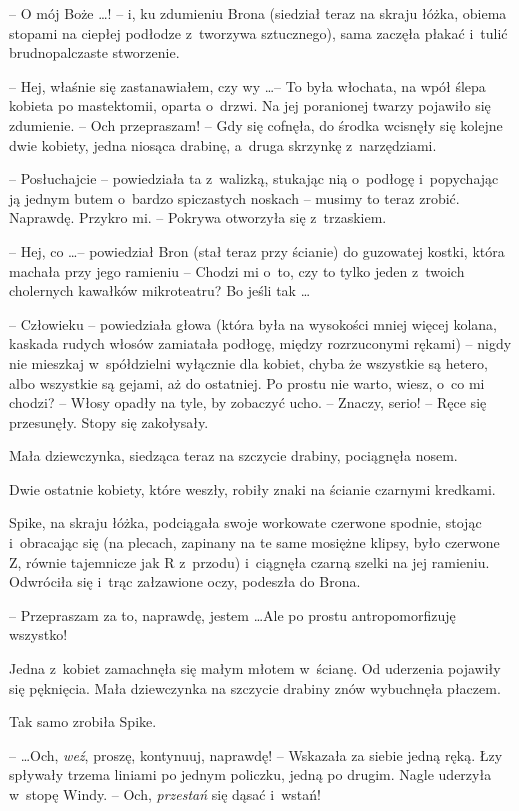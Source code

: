 \documentclass[oneside,polish,11pt,rmheadings]{mwbk}
\begin{document}
 -- O mój Boże \ldots ! -- i, ku zdumieniu Brona (siedział teraz na skraju łóżka, obiema stopami na ciepłej podłodze z~tworzywa sztucznego), sama zaczęła płakać i~tulić brudnopalczaste stworzenie.  

-- Hej, właśnie się zastanawiałem, czy wy \ldots  -- To była włochata, na wpół ślepa kobieta po mastektomii, oparta o~drzwi.  Na jej poranionej twarzy pojawiło się zdumienie. -- Och przepraszam! -- Gdy się cofnęła, do środka wcisnęły się kolejne dwie kobiety, jedna niosąca drabinę, a~druga skrzynkę z~narzędziami. 

-- Posłuchajcie -- powiedziała ta z~walizką, stukając nią o~podłogę i~popychając ją jednym butem o~bardzo spiczastych noskach -- musimy to teraz zrobić. Naprawdę. Przykro mi. -- Pokrywa otworzyła się z~trzaskiem. 

-- Hej, co \ldots  -- powiedział Bron (stał teraz przy ścianie) do guzowatej kostki, która machała przy jego ramieniu -- Chodzi mi o~to, czy to tylko jeden z~twoich cholernych kawałków mikroteatru? Bo jeśli tak \ldots  

-- Człowieku -- powiedziała głowa (która była na wysokości mniej więcej kolana, kaskada rudych włosów zamiatała podłogę, między rozrzuconymi rękami) -- nigdy nie mieszkaj w~spółdzielni wyłącznie dla kobiet, chyba że wszystkie są hetero, albo wszystkie są gejami, aż do ostatniej.  Po prostu nie warto, wiesz, o~co mi chodzi? -- Włosy opadły na tyle, by zobaczyć ucho.  -- Znaczy, serio! -- Ręce się przesunęły. Stopy się zakołysały. 

Mała dziewczynka, siedząca teraz na szczycie drabiny, pociągnęła nosem. 

Dwie ostatnie kobiety, które weszły, robiły znaki na ścianie czarnymi kredkami. 

Spike, na skraju łóżka, podciągała swoje workowate czerwone spodnie, stojąc i~obracając się (na plecach, zapinany na te same mosiężne klipsy, było czerwone Z, równie tajemnicze jak R z~przodu) i~ciągnęła czarną szelki na jej ramieniu. Odwróciła się i~trąc załzawione oczy, podeszła do Brona. 

-- Przepraszam za to, naprawdę, jestem \ldots   Ale po prostu antropomorfizuję wszystko! 

Jedna z~kobiet zamachnęła się małym młotem w~ścianę. Od uderzenia pojawiły się pęknięcia. Mała dziewczynka na szczycie drabiny znów wybuchnęła płaczem. 

Tak samo zrobiła Spike. 

--  \ldots  Och, \textit{weź}, proszę, kontynuuj,  naprawdę! -- Wskazała za siebie jedną ręką. Łzy spływały trzema liniami po jednym policzku, jedną po drugim. Nagle uderzyła w~stopę Windy. -- Och, \textit{przestań }się dąsać i~wstań! 
\end{document}
